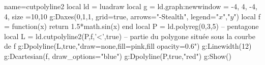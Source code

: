 \begin{luadraw}{name=cutpolyline2}
local ld = luadraw
local g = ld.graph:new{window = {-4, 4, -4, 4}, size ={10,10}}
g:Daxes({0,1,1}, {grid=true, arrows="-Stealth", legend={"$x$","$y$"}})
local f = function(x) return 1.5*math.sin(x) end
local P = ld.polyreg(0,3,5) -- pentagone
local L = ld.cutpolyline2(P,f,'<',true) -- partie du polygone située sous la courbe de f
g:Dpolyline(L,true,"draw=none,fill=pink,fill opacity=0.6")
g:Linewidth(12)
g:Dcartesian(f, {draw_options="blue"})
g:Dpolyline(P,true,"red")
g:Show()
\end{luadraw}
